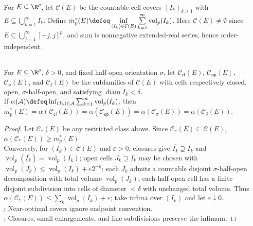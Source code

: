 \begin{definition} \label{def:cell-cover-outer-measure} \\
For $E\subseteq\R^p$, let $\mathcal{C}(E)$ be the countable cell covers $(I_k)_{k\geq1}$ with $E\subseteq\bigcup\limits_{k=1}^{\infty}I_k$. Define $m_p^\ast(E)\defeq\inf\limits_{(I_k)\in\mathcal{C}(E)}\sum\limits_{k=1}^{\infty}\operatorname{vol}_p(I_k)$.
Here $\mathcal{C}(E)\neq\emptyset$ since $E\subseteq\bigcup\limits_{j=1}^{\infty}[-j,j]^p$, and sum is nonnegative extended-real series, hence order-independent.
\end{definition}

\begin{proposition} \label{prop:outer-measure-cover-normalizations} \\
For $E\subseteq\R^p$, $\delta>0$, and fixed half-open orientation $\sigma$, let $\mathcal{C}_{\mathsf{cl}}(E)$, $\mathcal{C}_{\mathsf{op}}(E)$, $\mathcal{C}_{\sigma}(E)$, and $\mathcal{C}_{\delta}(E)$ be the subfamilies of $\mathcal{C}(E)$ with cells respectively closed, open, $\sigma$-half-open, and satisfying $\operatorname{diam}I_k<\delta$.\\
If $\alpha(\mathcal{A})\defeq\inf_{(I_k)\in\mathcal{A}}\sum_{k=1}^{\infty}\operatorname{vol}_p(I_k)$, then $m_p^\ast(E)=\alpha(\mathcal{C}_{\mathsf{cl}}(E))=\alpha(\mathcal{C}_{\mathsf{op}}(E))=\alpha(\mathcal{C}_{\sigma}(E))=\alpha(\mathcal{C}_{\delta}(E))$.
\begin{proof}
Let $\mathcal{C}_\ast(E)$ be any restricted class above. Since $\mathcal{C}_\ast(E)\subseteq\mathcal{C}(E)$, $\alpha(\mathcal{C}_\ast(E))\geq m_p^\ast(E)$.\\
Conversely, for $(I_k)\in\mathcal{C}(E)$ and $\varepsilon>0$, closures give $\overline{I_k}\supseteq I_k$ and $\operatorname{vol}_p(\overline{I_k})=\operatorname{vol}_p(I_k)$; open cells $J_k\supseteq I_k$ may be chosen with $\operatorname{vol}_p(J_k)\leq\operatorname{vol}_p(I_k)+\varepsilon2^{-k}$; each $J_k$ admits a countable disjoint $\sigma$-half-open decomposition with total volume $\operatorname{vol}_p(J_k)$; each half-open cell has a finite disjoint subdivision into cells of diameter $<\delta$ with unchanged total volume. Thus $\alpha(\mathcal{C}_\ast(E))\leq\sum_k\operatorname{vol}_p(I_k)+\varepsilon$; take infima over $(I_k)$ and let $\varepsilon\downarrow0$.\\
: Near-optimal covers ignore endpoint convention.\\
: Closures, small enlargements, and fine subdivisions preserve the infimum.
\end{proof}
\end{proposition}

